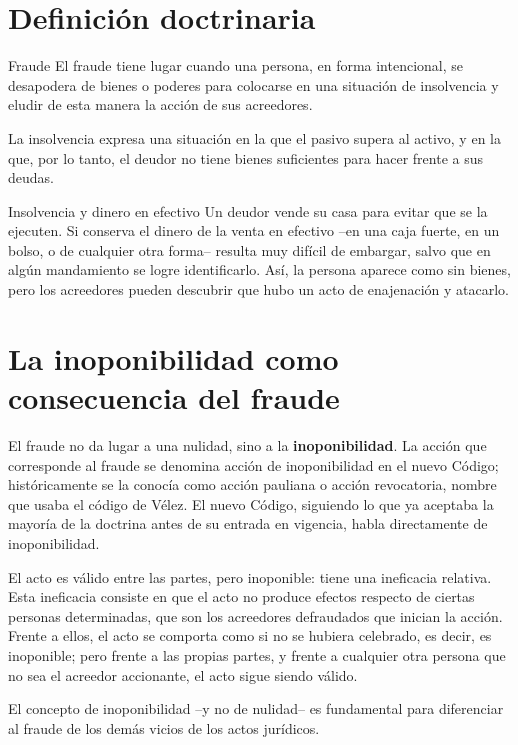 \documentclass[12pt,oneside]{book}
\begin{document}
\section{Definición doctrinaria}

\begin{definition}{Fraude}
El fraude tiene lugar cuando una persona, en forma intencional, se desapodera de bienes o poderes para colocarse en una situación de insolvencia y eludir de esta manera la acción de sus acreedores.
\end{definition}

La insolvencia expresa una situación en la que el pasivo supera al activo, y en la que, por lo tanto, el deudor no tiene bienes suficientes para hacer frente a sus deudas.

\begin{example}{Insolvencia y dinero en efectivo}
Un deudor vende su casa para evitar que se la ejecuten. Si conserva el dinero de la venta en efectivo --en una caja fuerte, en un bolso, o de cualquier otra forma-- resulta muy difícil de embargar, salvo que en algún mandamiento se logre identificarlo. Así, la persona aparece como sin bienes, pero los acreedores pueden descubrir que hubo un acto de enajenación y atacarlo.
\end{example}

\section{La inoponibilidad como consecuencia del fraude}

El fraude no da lugar a una nulidad, sino a la \textbf{inoponibilidad}. La acción que corresponde al fraude se denomina acción de inoponibilidad en el nuevo Código; históricamente se la conocía como acción pauliana o acción revocatoria, nombre que usaba el código de Vélez. El nuevo Código, siguiendo lo que ya aceptaba la mayoría de la doctrina antes de su entrada en vigencia, habla directamente de inoponibilidad.

El acto es válido entre las partes, pero inoponible: tiene una ineficacia relativa. Esta ineficacia consiste en que el acto no produce efectos respecto de ciertas personas determinadas, que son los acreedores defraudados que inician la acción. Frente a ellos, el acto se comporta como si no se hubiera celebrado, es decir, es inoponible; pero frente a las propias partes, y frente a cualquier otra persona que no sea el acreedor accionante, el acto sigue siendo válido.

\begin{important}
El concepto de inoponibilidad --y no de nulidad-- es fundamental para diferenciar al fraude de los demás vicios de los actos jurídicos.
\end{important}
\end{document}
